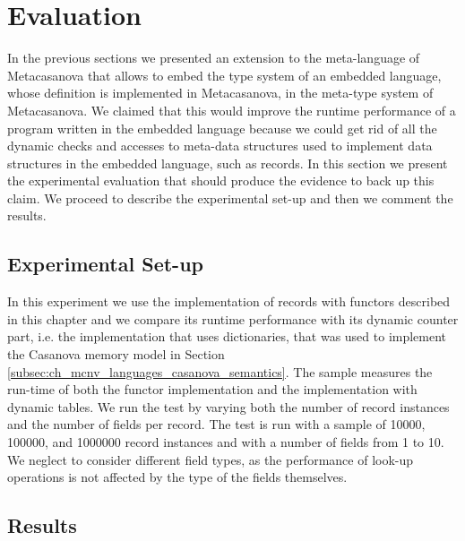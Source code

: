 \section{Evaluation}
\label{sec:ch_functors_evaluation}
In the previous sections we presented an extension to the meta-language of Metacasanova that allows to embed the type system of an embedded language, whose definition is implemented in Metacasanova, in the meta-type system of Metacasanova. We claimed that this would improve the runtime performance of a program written in the embedded language because we could get rid of all the dynamic checks and accesses to meta-data structures used to implement data structures in the embedded language, such as records. In this section we present the experimental evaluation that should produce the evidence to back up this claim. We proceed to describe the experimental set-up and then we comment the results.

\subsection{Experimental Set-up}
In this experiment we use the implementation of records with functors described in this chapter and we compare its runtime performance with its dynamic counter part, i.e. the implementation that uses dictionaries, that was used to implement the Casanova memory model in Section \ref{subsec:ch_mcnv_languages_casanova_semantics}. The sample measures the run-time of both the functor implementation and the implementation with dynamic tables. We run the test by varying both the number of record instances and the number of fields per record. The test is run with a sample of 10000, 100000, and 1000000 record instances and with a number of fields from 1 to 10. We neglect to consider different field types, as the performance of look-up operations is not affected by the type of the fields themselves.

\subsection{Results}

